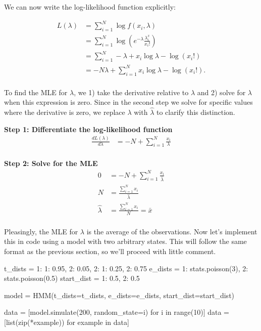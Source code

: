 We can now write the log-likelihood function explicitly:

\begin{align*}
L(\lambda)
&= \sum_{i=1}^N \log f(x_i, \lambda) \\
&= \sum_{i=1}^N \log \left( e^{-\lambda} \frac{\lambda^x_i}{x_i!} \right) \\
&= \sum_{i=1}^N -\lambda + x_i \log \lambda - \log (x_i!) \\
&= -N\lambda + \sum_{i=1}^N x_i \log \lambda - \log (x_i!). \\
\end{align*}

To find the MLE for $\lambda$, we 1) take the derivative relative to $\lambda$ and 2) solve for $\lambda$ when this expression is zero. Since in the second step we solve for specific values where the derivative is zero, we replace $\lambda$ with $\hat{\lambda}$ to clarify this distinction.

\textbf{Step 1: Differentiate the log-likelihood function}
\begin{align*}
\frac{dL(\lambda)}{d\lambda}
&= -N + \sum_{i=1}^N \frac{x_i}{\lambda} \\
\end{align*}

\textbf{Step 2: Solve for the MLE}
\begin{align*}
0 &= -N + \sum_{i=1}^N \frac{x_i}{\hat{\lambda}} \\
N &= \frac{\sum_{i=1}^N x_i}{\hat{\lambda}} \\
\hat{\lambda} &= \frac{\sum_{i=1}^N x_i}{N} = \bar{x} \\
\end{align*}

Pleasingly, the MLE for $\lambda$ is the average of the observations. Now let's implement this in code using a model with two arbitrary states. This will follow the same format as the previous section, so we'll proceed with little comment.

\begin{NotebookIn}
t_dists = {1: {1: 0.95, 2: 0.05},
           2: {1: 0.25, 2: 0.75}}
e_dists = {1: stats.poisson(3),
           2: stats.poisson(0.5)}
start_dist = {1: 0.5, 2: 0.5}

model = HMM(t_dists=t_dists, e_dists=e_dists, start_dist=start_dist)

data = [model.simulate(200, random_state=i) for i in range(10)]
data = [list(zip(*example)) for example in data]
\end{NotebookIn}

